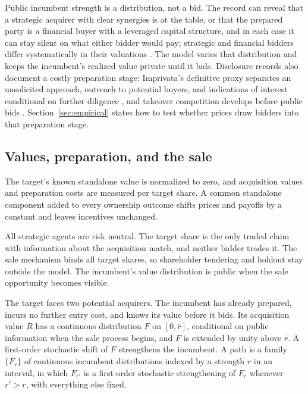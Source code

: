 Public incumbent strength is a distribution, not a bid. The record can reveal that a strategic acquirer with
clear synergies is at the table, or that the prepared party is a financial buyer with a leveraged capital
structure, and in each case it can stay silent on what either bidder would pay; strategic and financial bidders
differ systematically in their valuations \citep{GorbenkoMalenko2014}. The model varies that distribution and
keeps the incumbent's realized value private until it bids. Disclosure records also document a costly
preparation stage: Imprivata's definitive proxy separates an unsolicited approach, outreach to potential
buyers, and indications of interest conditional on further diligence \citep{Imprivata2016}, and takeover
competition develops before public bids \citep{BooneMulherin2007,GentryStroup2019}.
Section~\ref{sec:empirical} states how to test whether prices draw bidders into that preparation stage.

\subsection{Values, preparation, and the sale}\label{sec:values}

The target's known standalone value is normalized to zero, and acquisition values and preparation costs are
measured per target share. A common standalone component added to every ownership outcome shifts prices and
payoffs by a constant and leaves incentives unchanged.

All strategic agents are risk neutral. The target share is the only traded claim with information about the
acquisition match, and neither bidder trades it. The sale mechanism binds all target shares, so shareholder
tendering and holdout stay outside the model. The incumbent's value distribution is public when the sale
opportunity becomes visible.

The target faces two potential acquirers. The incumbent has already prepared, incurs no further entry cost,
and knows its value before it bids. Its acquisition value \(R\) has a continuous distribution \(F\) on
\([0,\bar r]\), conditional on public information when the sale process begins, and \(F\) is extended by
unity above \(\bar r\). A first-order stochastic shift of \(F\) strengthens the incumbent. A path is a family
\(\{F_r\}\) of continuous incumbent distributions indexed by a strength \(r\) in an interval, in which \(F_{r'}\) is
a first-order stochastic strengthening of \(F_r\) whenever \(r'>r\), with everything else fixed.

